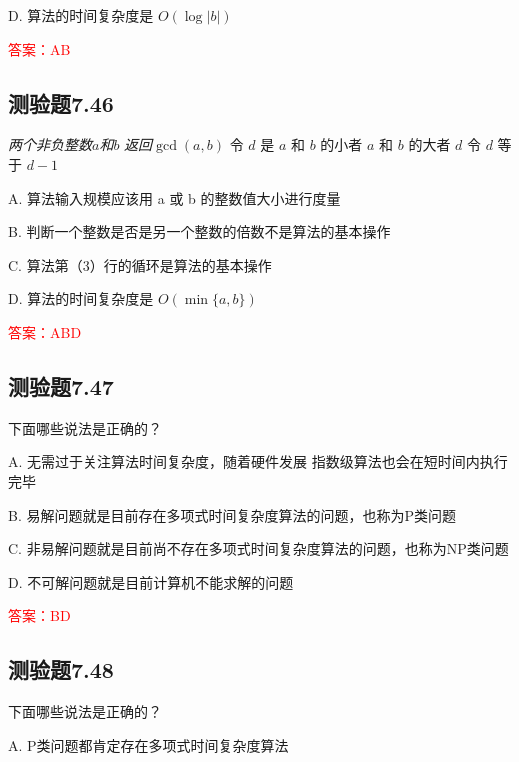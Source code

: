 \documentclass[UTF8, heading=true]{ctexart}
\begin{document}
D. 算法的时间复杂度是 $O(\log |b|)$

\textcolor{red}{答案：AB}

\subsection{测验题7.46}

\begin{algorithm}
  \caption{\textbf{计算两个数的最大公约数}}
  \begin{algorithmic}[1]
      \Require \textit{两个非负整数$a$和$b$}
      \Ensure \textit{返回$\operatorname{gcd}(a, b)$}
      \State 令 $d$ 是 $a$ 和 $b$ 的小者
          \State \Return $a$ 和 $b$ 的大者
      \EndIf
              \State \Return $d$
          \EndIf
          \State 令 $d$ 等于 $d - 1$
      \EndWhile
  \end{algorithmic}
\end{algorithm}

A. 算法输入规模应该用 a 或 b 的整数值大小进行度量

B. 
判断一个整数是否是另一个整数的倍数不是算法的基本操作

C. 
算法第（3）行的循环是算法的基本操作

D. 
算法的时间复杂度是 $O(\min \{a, b\})$

\textcolor{red}{答案：ABD}

\subsection{测验题7.47}

下面哪些说法是正确的？

A. 无需过于关注算法时间复杂度，随着硬件发展
指数级算法也会在短时间内执行完毕

B. 易解问题就是目前存在多项式时间复杂度算法的问题，也称为P类问题

C. 非易解问题就是目前尚不存在多项式时间复杂度算法的问题，也称为NP类问题

D. 不可解问题就是目前计算机不能求解的问题

\textcolor{red}{答案：BD}

\subsection{测验题7.48}

下面哪些说法是正确的？

A. P类问题都肯定存在多项式时间复杂度算法
\end{document}
